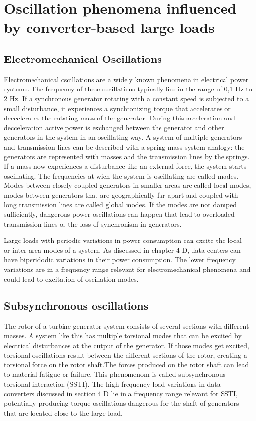 \documentclass[conference]{IEEEtran}
\begin{document}
\section{Oscillation phenomena influenced by converter-based large loads}


\subsection{Electromechanical Oscillations}
Electromechanical oscillations are a widely known phenomena in electrical power systems. The frequency of these oscillations typically lies in the range of 0,1 Hz to 2 Hz. If a synchronous generator rotating with a constant speed is subjected to a small disturbance, it experiences a synchronizing torque that accelerates or deccelerates the rotating mass of the generator. During this acceleration and decceleration active power is exchanged between the generator and other generators in the system in an oscillating way. A system of multiple generators and transmission lines can be described with a spring-mass system analogy: the generators are represented with masses and the transmission lines by the springs. If a mass now experiences a disturbance like an external force, the system starts oscillating. The frequencies at wich the system is oscillating are called modes. Modes between closely coupled generators in smaller areas are called local modes, modes between generators that are geographically far apart and coupled with long transmission lines are called global modes. If the modes are not damped sufficiently, dangerous power oscillations can happen that lead to overloaded transmission lines or the loss of synchronism in generators.\cite{ptd}

Large loads with periodic variations in power consumption can excite the local- or inter-area-modes of a system. As discussed in chapter 4 D, data centers can have biperidodic variations in their power consumption. The lower frequency variations are in a frequency range relevant for electromechanical phenomena and could lead to excitation of oscillation modes.

\subsection{Subsynchronous oscillations}
The rotor of a turbine-generator system consists of several sections with different masses. A system like this has multiple torsional modes that can be excited by electrical disturbances at the output of the generator. If those modes get excited, torsional oscillations result between the different sections of the rotor, creating a torsional force on the rotor shaft.\cite{kundur}The forces produced on the rotor shaft can lead to material fatigue or failure. This phenomenom is called subsynchronous torsional interaction (SSTI). The high frequency load variations in data converters discussed in section 4 D lie in a frequency range relevant for SSTI, potentially producing torque oscillations dangerous for the shaft of generators that are located close to the large load\cite{recomm}.
\end{document}
